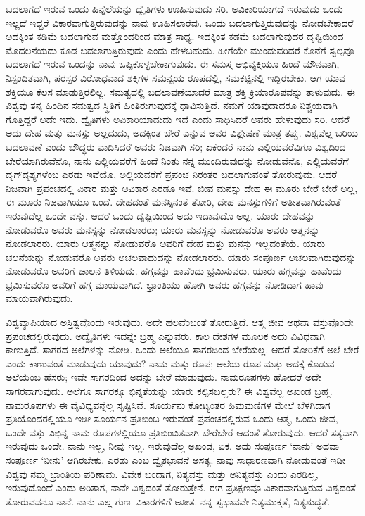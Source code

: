 ಬದಲಾಗದೆ ಇರುವ ಒಂದು ಹಿನ್ನೆಲೆಯನ್ನು ದ್ವೈತಿಗಳು ಊಹಿಸುವುದು ಸರಿ. ಅವಿಕಾರಿಯಾಗದೆ ಇರುವುದು ಒಂದು ಇಲ್ಲದೆ ಇದ್ದರೆ ವಿಕಾರವಾಗುತ್ತಿರುವುದನ್ನು ನಾವು ಊಹಿಸಲಾರೆವು. ಒಂದು ಬದಲಾಗುತ್ತಿರುವುದನ್ನು ನೋಡಬೇಕಾದರೆ ಅದಕ್ಕಿಂತ ಕಡಿಮೆ ಬದಲಾಗುವ ಮತ್ತೊಂದರಿಂದ ಮಾತ್ರ ಸಾಧ್ಯ. ಇದಕ್ಕಿಂತ ಕಡಮೆ ಬದಲಾಗುವುದರ ದೃಷ್ಟಿಯಿಂದ ಮೊದಲನೆಯದು ಕೂಡ ಬದಲಾಗುತ್ತಿರುವುದು ಎಂದು ಹೇಳಬಹುದು. ಹೀಗೆಯೇ ಮುಂದುವರಿದರೆ ಕೊನೆಗೆ ಸ್ವಲ್ಪವೂ ಬದಲಾಗದೆ ಇರುವ ಒಂದನ್ನು ನಾವು ಒಪ್ಪಿಕೊಳ್ಳಬೇಕಾಗುವುದು. ಈ ಸಮಸ್ತ ಅಭಿವ್ಯಕ್ತಿಯೂ ಹಿಂದೆ ಮೌನವಾಗಿ, ನಿಸ್ಪಂದಿತವಾಗಿ, ಪರಸ್ಪರ ವಿರೋಧವಾದ ಶಕ್ತಿಗಳ ಸಮನ್ವಯ ರೂಪದಲ್ಲಿ, ಸಮಕಟ್ಟಿನಲ್ಲಿ ಇದ್ದಿರಬೇಕು. ಆಗ ಯಾವ ಶಕ್ತಿಯೂ ಕೆಲಸ ಮಾಡುತ್ತಿರಲಿಲ್ಲ. ಸಮತ್ವದಲ್ಲಿ ಬದಲಾವಣೆಯಾದರೆ ಮಾತ್ರ ಶಕ್ತಿ ಕ್ರಿಯಾರೂಪವನ್ನು ತಾಳುವುದು. ಈ ವಿಶ್ವವು ತನ್ನ ಹಿಂದಿನ ಸಮತ್ವದ ಸ್ಥಿತಿಗೆ ಹಿಂತಿರುಗುವುದಕ್ಕೆ ಧಾವಿಸುತ್ತಿದೆ. ನಮಗೆ ಯಾವುದಾದರೂ ನಿಶ್ಚಯವಾಗಿ ಗೊತ್ತಿದ್ದರೆ ಅದೇ ಇದು. ದ್ವೈತಿಗಳು ಅವಿಕಾರಿಯಾದುದು ಇದೆ ಎಂದು ಸಾಧಿಸಿದರೆ ಅವರು ಹೇಳುವುದು ಸರಿ. ಆದರೆ ಅದು ದೇಹ ಮತ್ತು ಮನಸ್ಸು ಅಲ್ಲದುದು, ಅದಕ್ಕಿಂತ ಬೇರೆ ಎನ್ನುವ ಅವರ ವಿಶ್ಲೇಷಣೆ ಮಾತ್ರ ತಪ್ಪು. ವಿಶ್ವವೆಲ್ಲ ಬರಿಯ ಬದಲಾವಣೆ ಎಂದು ಬೌದ್ಧರು ವಾದಿಸಿದರೆ ಅವರು ನಿಜವಾಗಿ ಸರಿ; ಏಕೆಂದರೆ ನಾನು ಎಲ್ಲಿಯವರೆವಿಗೂ ವಿಶ್ವದಿಂದ ಬೇರೆಯಾಗಿರುವೆನೊ, ನಾನು ಎಲ್ಲಿಯವರೆಗೆ ಹಿಂದೆ ನಿಂತು ನನ್ನ ಮುಂದಿರುವುದನ್ನು ನೋಡುವೆನೊ, ಎಲ್ಲಿಯವರೆಗೆ ದೃಗ್​ದೃಶ್ಯಗಳೆಂಬ ಎರಡು ಇವೆಯೊ, ಅಲ್ಲಿಯವರೆಗೆ ಪ್ರಪಂಚ ನಿರಂತರ ಬದಲಾಗುವಂತೆ ತೋರುವುದು. ಆದರೆ ನಿಜವಾಗಿ ಪ್ರಪಂಚದಲ್ಲಿ ವಿಕಾರ ಮತ್ತು ಅವಿಕಾರ ಎರಡೂ ಇವೆ. ಜೀವ ಮನಸ್ಸು ದೇಹ ಈ ಮೂರು ಬೇರೆ ಬೇರೆ ಅಲ್ಲ, ಈ ಮೂರು ನಿಜವಾಗಿಯೂ ಒಂದೆ. ದೇಹದಂತೆ ಮನಸ್ಸಿನಂತೆ ತೋರಿ, ದೇಹ ಮನಸ್ಸುಗಳಿಗೆ ಅತೀತವಾಗಿರುವಂತೆ ಇರುವುದೆಲ್ಲ ಒಂದೇ ವಸ್ತು. ಆದರೆ ಒಂದು ದೃಷ್ಟಿಯಿಂದ ಅದು ಇದಾವುದೊ ಅಲ್ಲ. ಯಾರು ದೇಹವನ್ನು ನೋಡುವರೊ ಅವರು ಮನಸ್ಸನ್ನು ನೋಡಲಾರರು; ಯಾರು ಮನಸ್ಸನ್ನು ನೋಡುವರೊ ಅವರು ಆತ್ಮನನ್ನು ನೋಡಲಾರರು. ಯಾರು ಆತ್ಮನನ್ನು ನೋಡುವರೊ ಅವರಿಗೆ ದೇಹ ಮತ್ತು ಮನಸ್ಸು ಇಲ್ಲದಂತೆಯೆ. ಯಾರು ಚಲನೆಯನ್ನು ನೋಡುವರೊ ಅವರು ಅಚಲವಾದುದನ್ನು ನೋಡಲಾರರು. ಯಾರು ಸಂಪೂರ್ಣ ಅಚಲವಾಗಿರುವುದನ್ನು ನೋಡುವರೊ ಅವರಿಗೆ ಚಾಲನೆ ತಿಳಿಯದು. ಹಗ್ಗವನ್ನು ಹಾವೆಂದು ಭ್ರಮಿಸುವರು. ಯಾರು ಹಗ್ಗವನ್ನು ಹಾವೆಂದು ಭ್ರಮಿಸುವರೊ ಅವರಿಗೆ ಹಗ್ಗ ಮಾಯವಾಗಿದೆ. ಭ್ರಾಂತಿಯು ಹೋಗಿ ಅವರು ಹಗ್ಗವನ್ನು ನೋಡಿದಾಗ ಹಾವು ಮಾಯವಾಗಿರುವುದು.

ವಿಶ್ವವ್ಯಾಪಿಯಾದ ಅಸ್ತಿತ್ವವೊಂದು ಇರುವುದು. ಅದೇ ಹಲವೆಂಬಂತೆ ತೋರುತ್ತಿದೆ. ಆತ್ಮ ಜೀವ ಅಥವಾ ವಸ್ತುವೊಂದೇ ಪ್ರಪಂಚದಲ್ಲಿರುವುದು. ಅದ್ವೈತಿಗಳು ಇದನ್ನೇ ಬ್ರಹ್ಮ ಎನ್ನುವರು. ಕಾಲ ದೇಶಗಳ ಮೂಲಕ ಅದು ವಿವಿಧವಾಗಿ ಕಾಣುತ್ತಿದೆ. ಸಾಗರದ ಅಲೆಗಳನ್ನು ನೋಡಿ. ಒಂದು ಅಲೆಯೂ ಸಾಗರದಿಂದ ಬೇರೆಯಲ್ಲ. ಆದರೆ ತೋರಿಕೆಗೆ ಅಲೆ ಬೇರೆ ಎಂದು ಕಾಣುವಂತೆ ಮಾಡುವುದು ಯಾವುದು? ನಾಮ ಮತ್ತು ರೂಪ; ಅಲೆಯ ರೂಪ ಮತ್ತು ಅದಕ್ಕೆ ಕೊಡುವ ಅಲೆಯೆಂಬ ಹೆಸರು; ಇವೇ ಸಾಗರದಿಂದ ಅದನ್ನು ಬೇರೆ ಮಾಡುವುದು. ನಾಮರೂಪಗಳು ಹೋದರೆ ಅದೇ ಸಾಗರವಾಗುವುದು. ಅಲೆಗೂ ಸಾಗರಕ್ಕೂ ಭಿನ್ನತೆಯನ್ನು ಯಾರು ಕಲ್ಪಿಸಬಲ್ಲರು? ಈ ವಿಶ್ವವೆಲ್ಲ ಅಖಂಡ ಬ್ರಹ್ಮ. ನಾಮರೂಪಗಳು ಈ ವೈವಿಧ್ಯವನ್ನೆಲ್ಲ ಸೃಷ್ಟಿಸಿವೆ. ಸೂರ್ಯನು ಕೋಟ್ಯಂತರ ಹಿಮಮಣಿಗಳ ಮೇಲೆ ಬೆಳಗಿದಾಗ ಪ್ರತಿಯೊಂದರಲ್ಲಿಯೂ ಇಡೀ ಸೂರ್ಯನ ಪ್ರತಿಬಿಂಬ ಇರುವಂತೆ ಪ್ರಪಂಚದಲ್ಲಿರುವ ಒಂದು ಆತ್ಮ, ಒಂದು ಜೀವ, ಒಂದೇ ವಸ್ತು ವಿಭಿನ್ನ ನಾಮ ರೂಪಗಳಲ್ಲಿಯೂ ಪ್ರತಿಬಿಂಬಿತವಾಗಿ ಬೇರೆಬೇರೆ ಆದಂತೆ ತೋರುವುದು. ಆದರೆ ಸತ್ಯವಾಗಿ ಇರುವುದು ಒಂದೇ. ನಾನು ಇಲ್ಲ, ನೀವು ಇಲ್ಲ. ಇರುವುದೆಲ್ಲ ಅಖಂಡ, ಏಕ. ಅದು ಸಂಪೂರ್ಣ ‘ನಾನು’ ಅಥವಾ ಸಂಪೂರ್ಣ ‘ನೀನು’ ಆಗಿರಬೇಕು. ಎರಡು ಎಂಬ ದ್ವೈತಭಾವನೆ ಅಸತ್ಯ. ನಾವು ಸಾಧಾರಣವಾಗಿ ನೋಡುವಂತೆ ಇಡೀ ವಿಶ್ವವು ನಮ್ಮ ಭ್ರಾಂತಿಯ ಪರಿಣಾಮ. ವಿವೇಕ ಬಂದಾಗ, ನಿತ್ಯವಸ್ತು ಮತ್ತು ಅನಿತ್ಯವಸ್ತು ಎಂದು ಎರಡಿಲ್ಲ, ಇರುವುದೊಂದೆ ಎಂದು ಅರಿತಾಗ, ನಾನೇ ವಿಶ್ವದಂತೆ ತೋರುತ್ತೇನೆ. ಈಗ ಪ್ರತಿಕ್ಷಣವೂ ವಿಕಾರವಾಗುತ್ತಿರುವ ವಿಶ್ವದಂತೆ ತೋರುವವನೂ ನಾನೆ. ನಾನು ಎಲ್ಲ ಗುಣ–ವಿಕಾರಗಳಿಗೆ ಅತೀತ. ನನ್ನ ಸ್ವಭಾವವೇ ನಿತ್ಯಮುಕ್ತತೆ, ನಿತ್ಯಶುದ್ಧತೆ.

